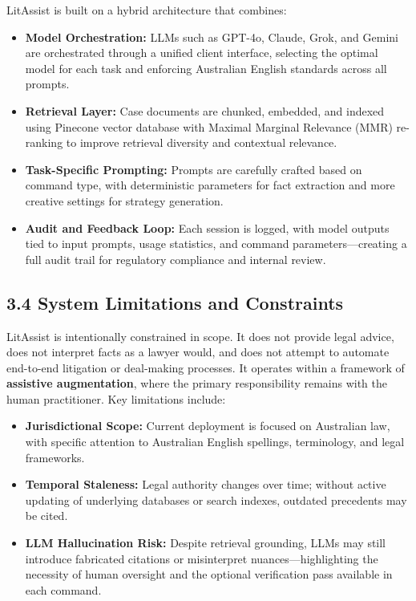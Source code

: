 \documentclass[12pt,a4paper]{article}
\begin{document}
LitAssist is built on a hybrid architecture that combines:

\begin{itemize}
\item \textbf{Model Orchestration:} LLMs such as GPT-4o, Claude, Grok, and Gemini are orchestrated through a unified client interface, selecting the optimal model for each task and enforcing Australian English standards across all prompts.

\item \textbf{Retrieval Layer:} Case documents are chunked, embedded, and indexed using Pinecone vector database with Maximal Marginal Relevance (MMR) re-ranking to improve retrieval diversity and contextual relevance.

\item \textbf{Task-Specific Prompting:} Prompts are carefully crafted based on command type, with deterministic parameters for fact extraction and more creative settings for strategy generation.

\item \textbf{Audit and Feedback Loop:} Each session is logged, with model outputs tied to input prompts, usage statistics, and command parameters—creating a full audit trail for regulatory compliance and internal review.
\end{itemize}

\subsection*{3.4 System Limitations and Constraints}

LitAssist is intentionally constrained in scope. It does not provide legal advice, does not interpret facts as a lawyer would, and does not attempt to automate end-to-end litigation or deal-making processes. It operates within a framework of \textbf{assistive augmentation}, where the primary responsibility remains with the human practitioner. Key limitations include:

\begin{itemize}
\item \textbf{Jurisdictional Scope:} Current deployment is focused on Australian law, with specific attention to Australian English spellings, terminology, and legal frameworks.

\item \textbf{Temporal Staleness:} Legal authority changes over time; without active updating of underlying databases or search indexes, outdated precedents may be cited.

\item \textbf{LLM Hallucination Risk:} Despite retrieval grounding, LLMs may still introduce fabricated citations or misinterpret nuances—highlighting the necessity of human oversight and the optional verification pass available in each command.
\end{itemize}
\end{document}
